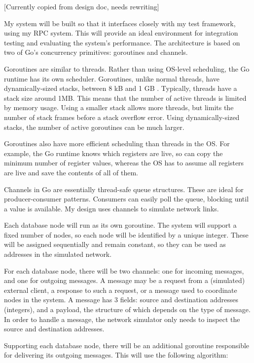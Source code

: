 \documentclass[12pt,a4paper,twoside,openany]{report}
\begin{document}
[Currently copied from design doc, needs rewriting]


My system will be built so that it interfaces closely with my test framework, using my RPC system. This will provide an ideal environment for integration testing and evaluating the system's performance. The architecture is based on two of Go's concurrency primitives: goroutines and channels.

Goroutines are similar to threads. Rather than using OS-level scheduling, the Go runtime has its own scheduler. Goroutines, unlike normal threads, have dynamically-sized stacks, between 8 kB and 1 GB \cite{gosrc}. Typically, threads have a stack size around 1MB. This means that the number of active threads is limited by memory usage. Using a smaller stack allows more threads, but limits the number of stack frames before a stack overflow error. Using dynamically-sized stacks, the number of active goroutines can be much larger.

Goroutines also have more efficient scheduling than threads in the OS. For example, the Go runtime knows which registers are live, so can copy the minimum number of register values, whereas the OS has to assume all registers are live and save the contents of all of them.

Channels in Go are essentially thread-safe queue structures. These are ideal for producer-consumer patterns. Consumers can easily poll the queue, blocking until a value is available. My design uses channels to simulate network links.

Each database node will run as its own goroutine. The system will support a fixed number of nodes, so each node will be identified by a unique integer. These will be assigned sequentially and remain constant, so they can be used as addresses in the simulated network. %

For each database node, there will be two channels: one for incoming messages, and one for outgoing messages. A message may be a request from a (simulated) external client, a response to such a request, or a message used to coordinate nodes in the system. A message has 3 fields: source and destination addresses (integers), and a payload, the structure of which depends on the type of message. In order to handle a message, the network simulator only needs to inspect the source and destination addresses.

Supporting each database node, there will be an additional goroutine responsible for delivering its outgoing messages. This will use the following algorithm:
\end{document}

